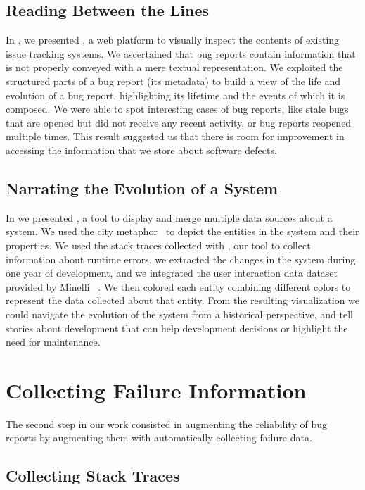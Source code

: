 \subsection{Reading Between the Lines}

In , we presented \ib, a web platform to visually inspect the contents of existing issue tracking systems.
We ascertained that bug reports contain information that is not properly conveyed with a mere textual representation.
We exploited the structured parts of a bug report (\eg its metadata) to build a view of the life and evolution of a bug report, highlighting its lifetime and the events of which it is composed.
We were able to spot interesting cases of bug reports, like stale bugs that are opened but did not receive any recent activity, or bug reports reopened multiple times.
This result suggested us that there is room for improvement in accessing the information that we store about software defects.



\subsection{Narrating the Evolution of a System}

In  we presented , a tool to display and merge multiple data sources about a system.
We used the city metaphor~\cite{Wett2011a} to depict the entities in the \pha system and their properties.
We used the stack traces collected with \sln, our tool to collect information about runtime errors, we extracted the changes in the \pha system during one year of development, and we integrated the user interaction data dataset provided by Minelli \etal~\cite{Mine2017a}.
We then colored each entity combining different colors to represent the data collected about that entity.
From the resulting visualization we could navigate the evolution of the system from a historical perspective, and tell stories about development that can help development decisions or highlight the need for maintenance.


\section{Collecting Failure Information}

The second step in our work consisted in augmenting the reliability of bug reports by augmenting them with automatically collecting failure data.

\subsection{Collecting Stack Traces}

